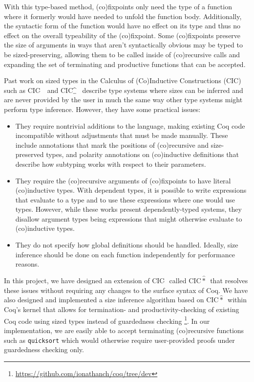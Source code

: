 \documentclass[sigplan,screen,authorversion,10pt,nonacm,natbib=false]{acmart}
\newcommand{\lang}{CIC$\widehat{*}$\ }
\newcommand{\CIChat}{CIC$\widehat{~}$\ }
\newcommand{\CIChatbar}{CIC$\widehat{\text{\underline{\:\:}}}$\ }
\newcommand{\coinductive}{(co)\-inductive }
\newcommand{\corecursive}{(co)\-recursive }
\newcommand{\cofixpoints}{(co)\-fixpoints }
\begin{document}
With this type-based method, \cofixpoints only need the type of a function where it formerly would have needed to unfold the function body. Additionally, the syntactic form of the function would have no effect on its type and thus no effect on the overall typeability of the (co)\-fixpoint. Some \cofixpoints preserve the size of arguments in ways that aren't syntactically obvious may be typed to be sized-preserving, allowing them to be called inside of \corecursive calls and expanding the set of terminating and productive functions that can be accepted.

Past work on sized types in the Calculus of (Co)Inductive Constructions (CIC) such as \CIChat\cite{cic-hat} and \CIChatbar\cite{cic-hat-bar} describe type systems where sizes can be inferred and are never provided by the user in much the same way other type systems might perform type inference. However, they have some practical issues:

\begin{itemize}[leftmargin=1em]
    \item They require nontrivial additions to the language, making existing Coq code incompatible without adjustments that must be made manually. These include annotations that mark the positions of \corecursive and size-preserved types, and polarity annotations on \coinductive definitions that describe how subtyping works with respect to their parameters.
    \item They require the \corecursive arguments of \cofixpoints to have literal \coinductive types. With dependent types, it is possible to write expressions that evaluate to a type and to use these expressions where one would use types. However, while these works present dependently-typed systems, they disallow argument types being expressions that might otherwise evaluate to \coinductive types.
    \item They do not specify how global definitions should be handled. Ideally, size inference should be done on each function independently for performance reasons.
\end{itemize}

In this project, we have designed an extension of \CIChat called \lang that resolves these issues without requiring any changes to the surface syntax of Coq. We have also designed and implemented a size inference algorithm based on \lang within Coq's kernel that allows for termination- and productivity-checking of existing Coq code using sized types instead of guardedness checking \footnote{\url{https://github.com/ionathanch/coq/tree/dev}}. In our implementation, we are easily able to accept terminating (co)recursive functions such as \texttt{quicksort} which would otherwise require user-provided proofs under guardedness checking only.

\printbibliography[title=\small{References}]
\end{document}

